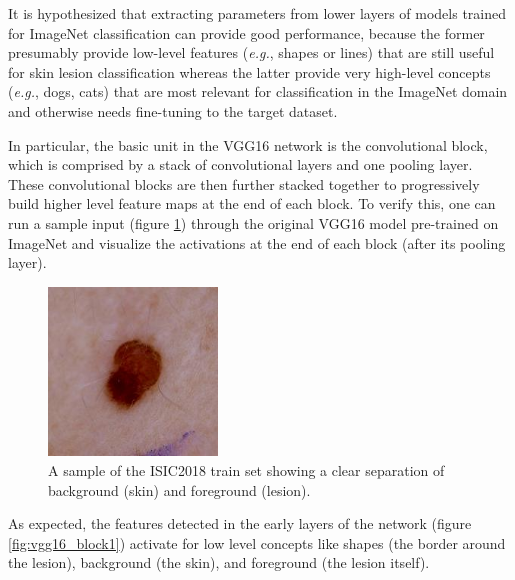 It is hypothesized that extracting parameters from lower layers of models trained for ImageNet classification can provide good performance, because the former presumably provide low-level features (\textit{e.g.}, shapes or lines) that are still useful for skin lesion classification whereas the latter provide very high-level concepts (\textit{e.g.}, dogs, cats) that are most relevant for classification in the ImageNet domain and otherwise needs fine-tuning to the target dataset.

In particular, the basic unit in the VGG16 network is the convolutional block, which is comprised by a stack of convolutional layers and one pooling layer. These convolutional blocks are then further stacked together to progressively build higher level feature maps at the end of each block. To verify this, one can run a sample input (figure \ref{fig:sample_input}) through the original VGG16 model pre-trained on ImageNet and visualize the activations at the end of each block (after its pooling layer).

\begin{figure}
    \centering
    \includegraphics[width=0.4\textwidth]{figs/sample_input.jpg}
    \caption{A sample of the ISIC2018 train set showing a clear separation of background (skin) and foreground (lesion).}
    \label{fig:sample_input}
\end{figure}

As expected, the features detected in the early layers of the network (figure \ref{fig:vgg16_block1}) activate for low level concepts like shapes (the border around the lesion), background (the skin), and foreground (the lesion itself).

